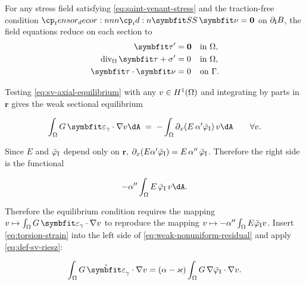 
For any stress field satisfying \eqref{eq:saint-venant-stress} and the traction-free condition \(\StressTensor\,\bm{\nu}=\mathbf{0}\) on \(\partial_{\mathbf{i}}B\),
the field equations reduce on each section to
\begin{subequations}
\begin{align}
\bm{\tau}'&=\mathbf{0} && \text{in }\Section,\\
\DivS\bm{\tau}+\AxialStress'&=0 && \text{in }\Section, %
\\
\bm{\tau}\cdot\bm\nu&=0 && \text{on }\SectionBoundary.
\end{align}
\end{subequations}




Testing \eqref{eq:sv-axial-equilibrium} with any \(v\in H^1(\Omega)\) and integrating by parts in \(\bm{r}\)
 gives the weak sectional equilibrium

\begin{equation}
\int_{\Section} G\,\PointShearStrain\cdot\nabla v\dA \;=\; -\int_{\Section} \partial_x(E\,\alpha'\WarpTwistIesan)\,v\dA
\qquad\forall v.
\label{eq:weak-nonuniform-residual}
\end{equation}

Since \(E\) and \(\bar{\varphi}_{\rm I}\) depend only on \(\bm{r}\),
\(\partial_x(E\alpha'\bar{\varphi}_{\rm I})=E\,\alpha''\,\bar{\varphi}_{\rm I}\). 
Therefore the right
side is the functional

\begin{equation}
-\alpha''\int_{\Section} E\,\WarpTwistIesan\,v \dA.
\label{eq:nonuniform-functional-rhs}
\end{equation}

Therefore the equilibrium condition requires the mapping
\(v\mapsto\int_{\Section} G\,\PointShearStrain\cdot\nabla v\) to reproduce the mapping
\(v\mapsto-\alpha''\int_{\Omega} E\bar{\varphi}_{\rm I} v\). 
%
Insert \eqref{eq:torsion-strain} into the left side of \eqref{eq:weak-nonuniform-residual} and apply \eqref{eq:def-sv-riesz}:

\begin{equation}
\int_{\Section} G\,\hat{\bm{\varepsilon}}_{\gamma}\cdot\nabla v
= (\alpha-\Twist)\int_{\Section} G\,\nabla\WarpTwistIesan\cdot\nabla v.
\label{eq:nonuniform-reduction}
\end{equation}

